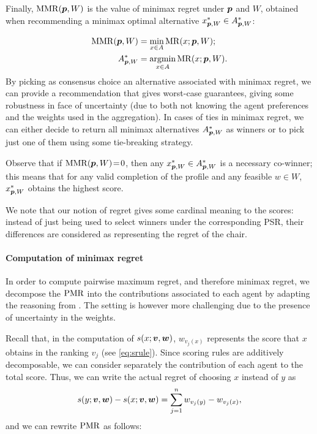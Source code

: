 \documentclass[sigconf, anonymous]{aamas}
\begin{document}
Finally,  $\operatorname{MMR}({\bm{p}},W)$ is the value of minimax regret under ${\bm{p}}$ and $W$, obtained when recommending a minimax optimal alternative $x^*_{{\bm{p}}, W} \in A^*_{{\bm{p}}, W}$:

\begin{align}
	\operatorname{MMR}({\bm{p}},W) & = \min_{x \in A} \operatorname{MR}(x;{\bm{p}},W); \\
	A^*_{{\bm{p}}, W} & = \operatorname*{argmin}_{x \in A} \operatorname{MR}(x;{\bm{p}},W).
\end{align}
By picking as consensus choice
an alternative associated with minimax regret, we can provide a recommendation that gives worst-case guarantees, giving some robustness in face of uncertainty (due to both not knowing the agent preferences and the weights used in the aggregation). 
In cases of ties in minimax regret, we can either decide to return all minimax alternatives $A^*_{{\bm{p}}, W}$ as winners or to pick just one of them using some tie-breaking strategy.

Observe that if $\operatorname{MMR}({\bm{p}}, W)\!=\!0$, then any $x^{*}_{{\bm{p}},W} \in A^*_{{\bm{p}}, W}$ is a necessary co-winner; this means that for any valid completion of the profile and any feasible $w \in W$, $x^{*}_{{\bm{p}},W}$ obtains the highest score.

We note that our notion of regret gives some cardinal meaning to the scores: instead of just being used to select winners under the corresponding PSR, their differences are considered as representing the regret of the chair.


\paragraph{Computation of minimax regret}
In order to compute pairwise maximum regret, and therefore minimax regret, we decompose the $\operatorname{PMR}$ into the contributions associated to each agent by adapting the reasoning from \citet{Lu2011}.
The setting is however more challenging due to the presence of uncertainty in the weights.

Recall that, in the computation of $s(x; \bm{v}, \bm{w})$, $w_{v_j(x)}$ represents the score that $x$ obtains in the ranking $v_j$ (see \cref{eq:srule}).
Since scoring rules are additively decomposable, we can consider separately the contribution of each agent to the total score. Thus, we can write the actual regret of choosing $x$ instead of $y$ as
\[
s(y; \bm{v},\bm{w}) - s(x; \bm{v}, \bm{w}) = \sum_{j=1}^n w_{v_j(y)} - w_{v_j(x)},
\]
and we can rewrite $\operatorname{PMR}$ as follows:
\end{document}
